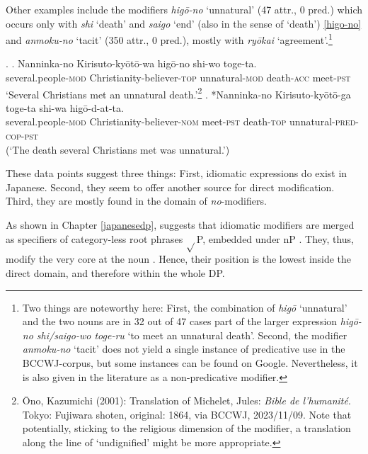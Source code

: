 \documentclass [output=book,colorlinks,citecolor=brown]{langscibook}
\begin{document}
Other examples include the modifiers \textit{higō-no} `unnatural’ (47 attr., 0 pred.) which occurs only with \textit{shi} `death’ and \textit{saigo} `end’ (also in the sense of `death’) \ref{higo-no} and \textit{anmoku-no} `tacit’ (350 attr., 0 pred.), mostly with \textit{ryōkai} `agreement’.\footnote{Two things are noteworthy here: First, the combination of \textit{higō} `unnatural’ and the two nouns are in 32 out of 47 cases part of the larger expression \textit{higō-no shi/saigo-wo toge-ru} `to meet an unnatural death’. Second, the modifier \textit{anmoku-no} `tacit’ does not yield a single instance of predicative use in the BCCWJ-corpus, but some instances can be found on Google. Nevertheless, it is also given in the literature \citep{muraki:2012:nihongo, lehmann:2015:japanisch} as a non-predicative modifier.} %

\ex. \label{higo-no} \ag. Nanninka-no Kirisuto-kyōtō-wa higō-no shi-wo toge-ta.\\
several.people-\textsc{mod} Christianity-believer-\textsc{top} unnatural-\textsc{mod} death-\textsc{acc} meet-\textsc{pst}\\
`Several Christians met an unnatural death.’\footnote{Ōno, Kazumichi (2001): Translation of Michelet, Jules: \textit{Bible de l’humanité}. Tokyo: Fujiwara shoten, original: 1864, via BCCWJ, 2023/11/09. Note that potentially, sticking to the religious dimension of the modifier, a translation along the line of `undignified’ might be more appropriate.}
\bg. *Nanninka-no Kirisuto-kyōtō-ga toge-ta shi-wa higō-d-at-ta.\\
several.people-\textsc{mod} Christianity-believer-\textsc{nom} meet-\textsc{pst} death-\textsc{top} unnatural-\textsc{pred-cop-pst}\\
(`The death several Christians met was unnatural.’)

These data points suggest three things: First, idiomatic expressions do exist in Japanese. Second, they seem to offer another source for direct modification. Third, they are mostly found in the domain of \textit{no}-modifiers.

As shown in Chapter \ref{japanesedp}, \citet{svenonius:2008:position} suggests that idiomatic modifiers are merged as specifiers of category-less root phrases $\sqrt{}$P, embedded under nP \citep{marantz:1997:no}. They, thus, modify the very core at the noun \citep[36–37]{svenonius:2008:position}. Hence, their position is the lowest inside the direct domain, and therefore within the whole DP.
\end{document}
